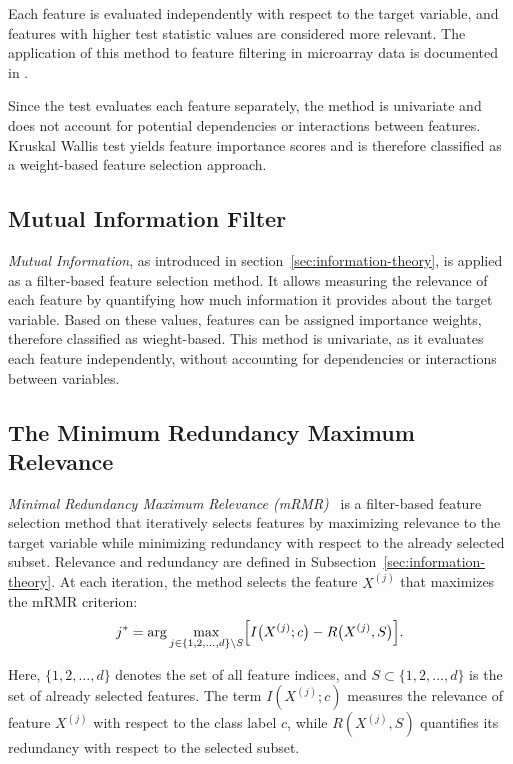 Each feature is evaluated independently with respect to the target variable, and features with higher test statistic values are considered more relevant. The application of this method to feature filtering in microarray data is documented in \cite{grisci2019}.

Since the test evaluates each feature separately, the method is univariate and does not account for potential dependencies or interactions between features. Kruskal Wallis test yields feature importance scores and is therefore classified as a weight-based feature selection approach.

\subsection{Mutual Information Filter}
\emph{Mutual Information}, as introduced in section~\ref{sec:information-theory}, is applied as a filter-based feature selection method. It allows measuring the relevance of each feature by quantifying how much information it provides about the target variable. Based on these values, features can be assigned importance weights, therefore classified as wieght-based. This method is univariate, as it evaluates each feature independently, without accounting for dependencies or interactions between variables.

\subsection{The Minimum Redundancy Maximum Relevance}
\emph{Minimal Redundancy Maximum Relevance (mRMR)}~\cite{peng2005} is a filter-based feature selection method that iteratively selects features by maximizing relevance to the target variable while minimizing redundancy with respect to the already selected subset. Relevance and redundancy are defined in Subsection~\ref{sec:information-theory}. At each iteration, the method selects the feature $X^{(j)}$ that maximizes the mRMR criterion:
\begin{equation*}
j^* = \arg\max_{j \in \{1,2,\dots,d\} \setminus S} \Bigl[ I\bigl(X^{(j)}; c\bigr) - R\bigl(X^{(j)}, S\bigr) \Bigr].
\end{equation*}

Here, $\{1,2,\dots,d\}$ denotes the set of all feature indices, and $S \subset \{1,2,\dots,d\}$ is the set of already selected features. The term $I(X^{(j)}; c)$ measures the relevance of feature $X^{(j)}$ with respect to the class label $c$, while $R(X^{(j)}, S)$ quantifies its redundancy with respect to the selected subset.

